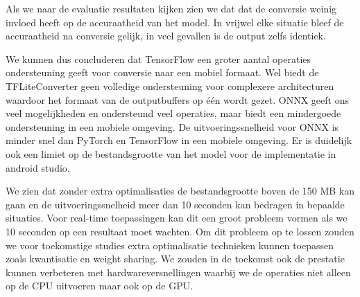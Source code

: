 Als we naar de evaluatie resultaten kijken zien we dat dat de conversie weinig invloed heeft op de accuraatheid van het model.
In vrijwel elke situatie bleef de accuraatheid na conversie gelijk, in veel gevallen is de output zelfs identiek.

We kunnen dus concluderen dat TensorFlow een groter aantal operaties ondersteuning geeft voor conversie naar een mobiel formaat.
Wel biedt de TFLiteConverter geen volledige ondersteuning voor complexere architecturen waardoor het formaat van de outputbuffers op \'e\'en wordt gezet.
ONNX geeft ons veel mogelijkheden en ondersteund veel operaties, maar biedt een mindergoede ondersteuning in een mobiele omgeving.
De uitvoeringssnelheid voor ONNX is minder snel dan PyTorch en TensorFlow in een mobiele omgeving.
Er is duidelijk ook een limiet op de bestandsgrootte van het model voor de implementatie in android studio.

We zien dat zonder extra optimalisaties de bestandsgrootte boven de 150 MB kan gaan en de uitvoeringssnelheid meer dan 10 seconden kan bedragen in bepaalde situaties.
Voor real-time toepassingen kan dit een groot probleem vormen als we 10 seconden op een resultaat moet wachten.
Om dit probleem op te lossen zouden we voor toekomstige studies extra optimalisatie technieken kunnen toepassen zoals kwantisatie en weight sharing.
We zouden in de toekomst ook de prestatie kunnen verbeteren met hardwareversnellingen waarbij we de operaties niet alleen op de CPU uitvoeren maar ook op de GPU. 